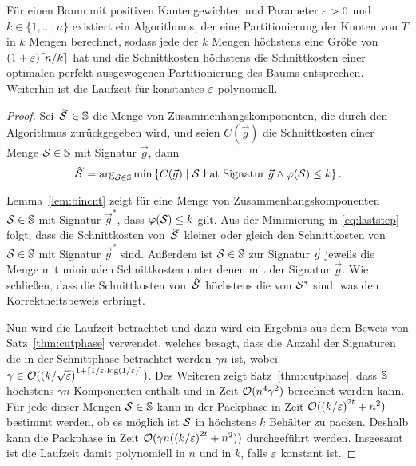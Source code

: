     \begin{thm}\label{thm:treealg}
        Für einen Baum mit positiven Kantengewichten und Parameter $\varepsilon > 0$ und $k \in \{1, \ldots, n\}$ existiert ein Algorithmus, der eine Partitionierung der Knoten von $T$ in $k$ Mengen berechnet, sodass jede der $k$ Mengen höchstens eine Größe von $(1 + \eps) \ceil*{n/k}$ hat und die Schnittkosten höchstens die Schnittkosten einer optimalen perfekt ausgewogenen Partitionierung des Baums entsprechen. 
        Weiterhin ist die Laufzeit für konstantes $\varepsilon$ polynomiell.
    \end{thm}
    \begin{proof}
        Sei $\tildaS \in \bbS$ die Menge von Zusammenhangskomponenten, die durch den Algorithmus zurückgegeben wird, und seien $C(\vec{g})$ die Schnittkosten einer Menge $\mathcal{S} \in \mathbb{S}$ mit Signatur $\vec{g}$, dann
        \begin{equation}\label{eq:laststep}
            \tildaS = \arg_{\calS \in \bbS} \min \left\{ C(\vec{g}) \mid \calS\ \text{hat Signatur}\ \vec{g} \land \varphi(\calS) \leq k \right\}.
        \end{equation}

        Lemma~\ref{lem:bincnt} zeigt für eine Menge von Zusammenhangskomponenten $\mathcal{S} \in \mathbb{S}$ mit Signatur $\vec{g}^*$, dass $\varphi(\mathcal{S}) \leq k$ gilt.
        Aus der Minimierung in \eqref{eq:laststep} folgt, dass die Schnittkosten von $\tildaS$ kleiner oder gleich den Schnittkosten von $\mathcal{S} \in \mathbb{S}$ mit Signatur $\vec{g}^*$ sind.
        Außerdem ist $\mathcal{S} \in \mathbb{S}$ zur Signatur $\vec{g}$ jeweils die Menge mit minimalen Schnittkosten unter denen mit der Signatur $\vec{g}$.
        Wie schließen, dass die Schnittkosten von $\tildaS$ höchstens die von $\mathcal{S}^*$ sind, was den Korrektheitsbeweis erbringt.

        Nun wird die Laufzeit betrachtet und dazu wird ein Ergebnis aus dem Beweis von Satz~\ref{thm:cutphase} verwendet, welches besagt, dass die Anzahl der Signaturen die in der Schnittphase betrachtet werden $\gamma n$ ist, wobei $\gamma \in \mathcal{O}({(k/\sqrt{\varepsilon})}^{1 + \lceil1/\varepsilon \cdot \log(1/\varepsilon)\rceil})$. 
        Des Weiteren zeigt Satz~\ref{thm:cutphase}, dass $\mathbb{S}$ höchstens $\gamma n$ Komponenten enthält und in Zeit $\mathcal{O}(n^4 \gamma^2)$ berechnet werden kann. 
        Für jede dieser Mengen $\mathcal{S} \in \mathbb{S}$ kann in der Packphase in Zeit $\mathcal{O}({(k/\varepsilon)}^{2t} + n^2)$ bestimmt werden, ob es möglich ist $\mathcal{S}$ in höchstens $k$ Behälter zu packen.
        Deshalb kann die Packphase in Zeit $\mathcal{O}(\gamma n ({(k/\varepsilon)}^{2t} + n^2))$ durchgeführt werden.
        Insgesamt ist die Laufzeit damit polynomiell in $n$ und in $k$, falls $\varepsilon$ konstant ist.
    \end{proof}

